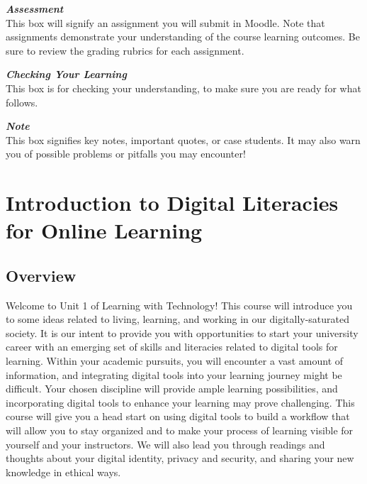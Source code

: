 \documentclass[
]{book}
\theoremstyle{definition}
\theoremstyle{definition}
\theoremstyle{definition}
\theoremstyle{definition}
\theoremstyle{remark}
\begin{document}
\begin{assessment}
\textbf{\emph{Assessment}}\\
This box will signify an assignment you will submit in Moodle. Note that
assignments demonstrate your understanding of the course learning
outcomes. Be sure to review the grading rubrics for each assignment.
\end{assessment}

\begin{progress}
\textbf{\emph{Checking Your Learning}}\\
This box is for checking your understanding, to make sure you are ready
for what follows.
\end{progress}

\begin{feedback}
\textbf{\emph{Note}}\\
This box signifies key notes, important quotes, or case students. It may
also warn you of possible problems or pitfalls you may encounter!
\end{feedback}

\hypertarget{introduction-to-digital-literacies-for-online-learning}{%
\chapter{Introduction to Digital Literacies for Online Learning}\label{introduction-to-digital-literacies-for-online-learning}}

\hypertarget{overview}{%
\section*{Overview}\label{overview}}

Welcome to Unit 1 of Learning with Technology! This course will introduce you to some ideas related to living, learning, and working in our digitally-saturated society. It is our intent to provide you with opportunities to start your university career with an emerging set of skills and literacies related to digital tools for learning. Within your academic pursuits, you will encounter a vast amount of information, and integrating digital tools into your learning journey might be difficult. Your chosen discipline will provide ample learning possibilities, and incorporating digital tools to enhance your learning may prove challenging. This course will give you a head start on using digital tools to build a workflow that will allow you to stay organized and to make your process of learning visible for yourself and your instructors. We will also lead you through readings and thoughts about your digital identity, privacy and security, and sharing your new knowledge in ethical ways.
\end{document}
